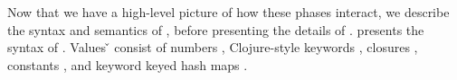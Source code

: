 %
%
%
%
%

Now that we have a high-level picture of how these phases interact,
we describe the syntax and semantics of \lambdatrack{}, before
presenting the details of \collectOp{}.
%
 presents the syntax of \lambdatrack{}.
Values \v{} consist of numbers \num{}, Clojure-style keywords {\kw{}},
closures {\closure{\uabs{\x{}}{\e{}}}{\openv{}}}, constants \const{},
and keyword keyed hash maps {\curlymapvaloverrightnoarrow{\kw{}}{\val{}}}.

